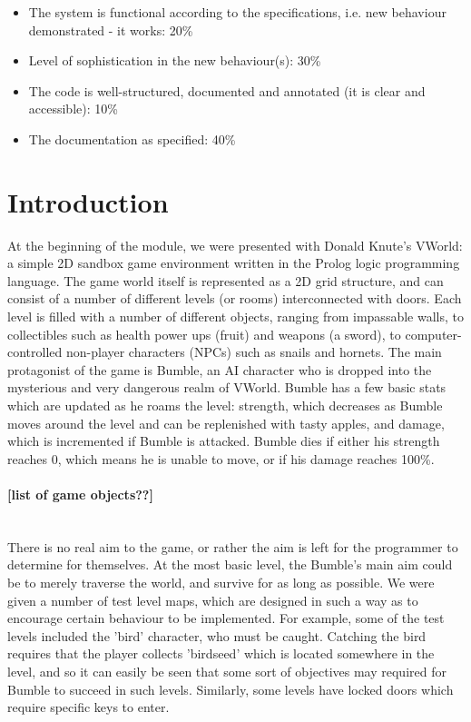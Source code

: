 \documentclass[a4paper,oneside]{report}
\begin{document}
\begin{itemize}
\item The system is functional according to the specifications, i.e. new behaviour demonstrated - it works: 20\%
\item Level of sophistication in the new behaviour(s): 30\%
\item The code is well-structured, documented and annotated (it is clear and accessible): 10\%
\item The documentation as specified: 40\%
\end{itemize}


\section{Introduction}

At the beginning of the module, we were presented with Donald Knute's VWorld: a simple 2D sandbox game environment written in the Prolog logic programming language. The game world itself is represented as a 2D grid structure, and can consist of a number of different levels (or rooms) interconnected with doors. Each level is filled with a number of different objects, ranging from impassable walls, to collectibles such as health power ups (fruit) and weapons (a sword), to computer-controlled non-player characters (NPCs) such as snails and hornets. The main protagonist of the game is Bumble, an AI character who is dropped into the mysterious and very dangerous realm of VWorld. Bumble has a few basic stats which are updated as he roams the level: strength, which decreases as Bumble moves around the level and can be replenished with tasty apples, and damage, which is incremented if Bumble is attacked. Bumble dies if either his strength reaches 0, which means he is unable to move, or if his damage reaches 100\%.

\paragraph{[list of game objects??]}\ \\

There is no real aim to the game, or rather the aim is left for the programmer to determine for themselves. At the most basic level, the Bumble's main aim could be to merely traverse the world, and survive for as long as possible. We were given a number of test level maps, which are designed in such a way as to encourage certain behaviour to be implemented. For example, some of the test levels included the 'bird' character, who must be caught. Catching the bird requires that the player collects 'birdseed' which is located somewhere in the level, and so it can easily be seen that some sort of objectives may required for Bumble to succeed in such levels. Similarly, some levels have locked doors which require specific keys to enter.
\end{document}

